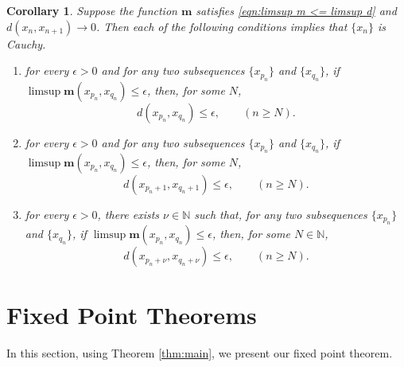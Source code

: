 \documentclass[a4paper,10pt,twoside,reqno]{amsart}
\newtheorem{cor}[thm]{Corollary}
\theoremstyle{definition}
\theoremstyle{remark}
\newcommand{\set}[1]{\{#1\}}
\newcommand{\e}{\epsilon}
\newcommand{\N}{\mathbb{N}}
\newcommand{\m}{\mathbf{m}}
\numberwithin{equation}{section}
\begin{document}
\begin{cor}
\label{cor:main}
  Suppose the function $\m$ satisfies \eqref{eqn:limsup m <= limsup d} and
  $d(x_n,x_{n+1})\to0$. Then each of the following conditions implies that
  $\set{x_n}$ is Cauchy.
  \begin{enumerate}[\upshape(i)]
    \item \label{item:cor:main:nu=0}
    for every $\e>0$ and for any two subsequences $\{x_{p_n}\}$ and $\{x_{q_n}\}$,
    if \newline
    $\limsup \m(x_{p_n},x_{q_n}) \leq \e$, then, for some $N$,
    \begin{equation*}
      d(x_{p_n},x_{q_n}) \leq \e, \qquad (n\geq N).
    \end{equation*}

    \item \label{item:cor:main:nu=1}
    for every $\e>0$ and for any two subsequences $\{x_{p_n}\}$ and $\{x_{q_n}\}$,
    if \newline
    $\limsup \m(x_{p_n},x_{q_n}) \leq \e$, then, for some $N$,
    \begin{equation*}
      d(x_{p_n+1},x_{q_n+1}) \leq \e, \qquad (n\geq N).
    \end{equation*}

    \item \label{item:cor:main:nu}
    for every $\e>0$, there exists $\nu\in\N$
    such that, for any two subsequences
    $\{x_{p_n}\}$ and $\{x_{q_n}\}$, if\/ $\limsup \m(x_{p_n},x_{q_n})\leq \e$,
    then, for some $N\in\N$,
    \begin{equation*}
      d(x_{p_n+\nu},x_{q_n+\nu}) \leq \e, \qquad (n\geq N).
    \end{equation*}

  \end{enumerate}
\end{cor}

\bigskip


\section{Fixed Point Theorems}%
\label{sec:fixed-point-theorems}

In this section, using Theorem \ref{thm:main}, we present our fixed point theorem.
\end{document}
